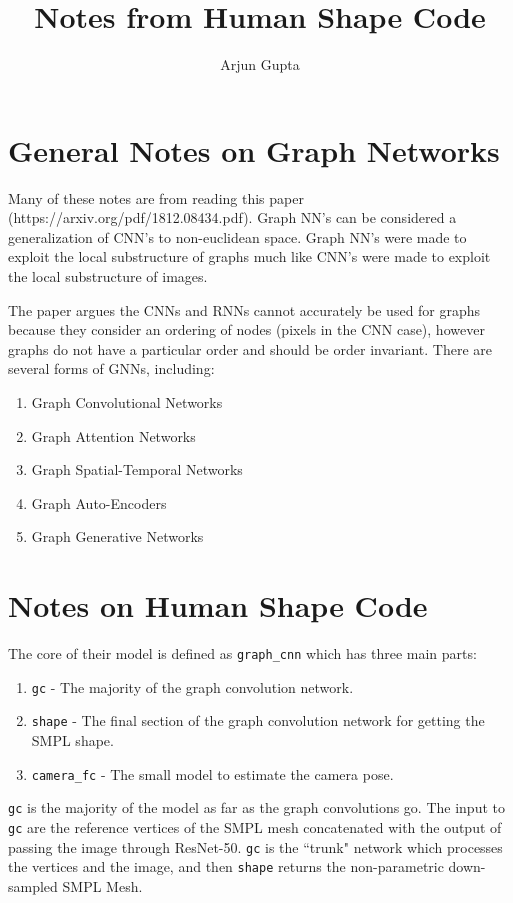 \documentclass{report}
\title{Notes from Human Shape Code}
\author{Arjun Gupta}
\begin{document}
	\maketitle  
	\section{General Notes on Graph Networks}
	Many of these notes are from reading this paper (https://arxiv.org/pdf/1812.08434.pdf). Graph NN's can be considered a generalization of CNN's to non-euclidean space. Graph NN's were made to exploit the local substructure of graphs much like CNN's were made to 
	exploit the local substructure of images. 
	
	The paper argues the CNNs and RNNs cannot accurately be used for graphs because they consider an ordering of nodes (pixels in the CNN case), however graphs do not have a particular order and should be order invariant. There are several forms of GNNs, including:
	
	\begin{enumerate}
		\item Graph Convolutional Networks
		\item Graph Attention Networks
		\item Graph Spatial-Temporal Networks
		\item Graph Auto-Encoders
		\item Graph Generative Networks
	\end{enumerate}

	
	\section{Notes on Human Shape Code}
	The core of their model is defined as \texttt{graph\_cnn} which has three main parts:
	
	\begin{enumerate}
		\item \texttt{gc} - The majority of the graph convolution network.
		\item \texttt{shape} - The final section of the graph convolution network for getting the SMPL shape.
		\item \texttt{camera\_fc} - The small model to estimate the camera pose.
	\end{enumerate}

	\texttt{gc} is the majority of the model as far as the graph convolutions go. The input to \texttt{gc} are the reference vertices of the SMPL mesh concatenated with the output of passing the image through ResNet-50. \texttt{gc} is the ``trunk" network which processes the vertices and the image, and then \texttt{shape} returns the non-parametric down-sampled SMPL Mesh.
	
\end{document}
